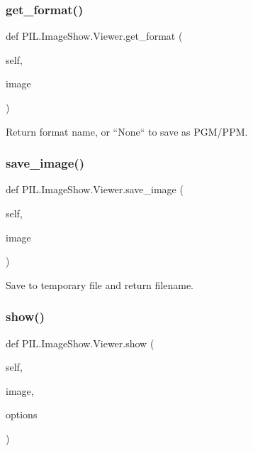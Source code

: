 \subsubsection{\texorpdfstring{get\+\_\+format()}{get\_format()}}
{\footnotesize\ttfamily def P\+I\+L.\+Image\+Show.\+Viewer.\+get\+\_\+format (\begin{DoxyParamCaption}\item[{}]{self,  }\item[{}]{image }\end{DoxyParamCaption})}

\begin{DoxyVerb}Return format name, or ``None`` to save as PGM/PPM.\end{DoxyVerb}
 \mbox{\label{classPIL_1_1ImageShow_1_1Viewer_aad5e9724c2b373048c41ff41cf4942fb}} 
\subsubsection{\texorpdfstring{save\+\_\+image()}{save\_image()}}
{\footnotesize\ttfamily def P\+I\+L.\+Image\+Show.\+Viewer.\+save\+\_\+image (\begin{DoxyParamCaption}\item[{}]{self,  }\item[{}]{image }\end{DoxyParamCaption})}

\begin{DoxyVerb}Save to temporary file and return filename.\end{DoxyVerb}
 \mbox{\label{classPIL_1_1ImageShow_1_1Viewer_a41a13880da52d51728c1310d4820a6cd}} 
\subsubsection{\texorpdfstring{show()}{show()}}
{\footnotesize\ttfamily def P\+I\+L.\+Image\+Show.\+Viewer.\+show (\begin{DoxyParamCaption}\item[{}]{self,  }\item[{}]{image,  }\item[{}]{options }\end{DoxyParamCaption})}


